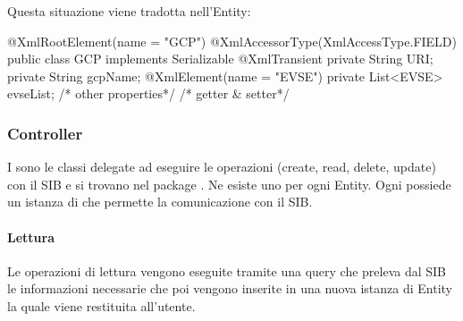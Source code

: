 Questa situazione viene tradotta nell'Entity:

\begin{java}[caption={Entity di esempio},label=lst:entity]
@XmlRootElement(name = "GCP")
@XmlAccessorType(XmlAccessType.FIELD)
public class GCP implements Serializable {
	@XmlTransient
	private String URI;
	private String gcpName;
	@XmlElement(name = "EVSE")
	private List<EVSE> evseList;
	/* other properties*/
	/* getter & setter*/	
}
\end{java}




\subsubsection{Controller}

I  sono le classi delegate ad eseguire le operazioni  (create, read, delete, update) con il SIB e si trovano nel package . Ne esiste uno per ogni Entity. Ogni  possiede un istanza di  che permette la comunicazione con il SIB. 

\paragraph{Lettura} Le operazioni di lettura vengono eseguite tramite una query  che preleva dal SIB le informazioni necessarie che poi vengono inserite in una nuova istanza di Entity la quale viene restituita all'utente.

